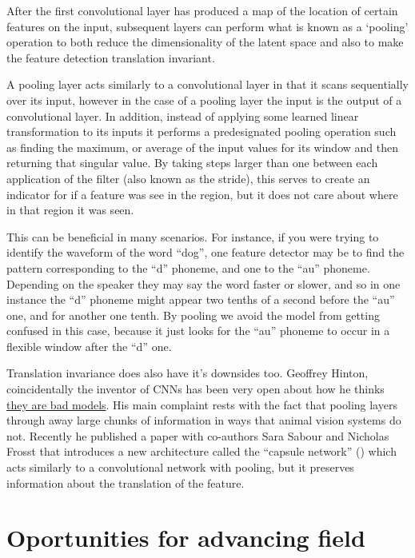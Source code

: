 \documentclass[]{book}
\theoremstyle{definition}
\theoremstyle{definition}
\theoremstyle{definition}
\theoremstyle{remark}
\begin{document}
After the first convolutional layer has produced a map of the location
of certain features on the input, subsequent layers can perform what is
known as a `pooling' operation to both reduce the dimensionality of the
latent space and also to make the feature detection translation
invariant.

A pooling layer acts similarly to a convolutional layer in that it scans
sequentially over its input, however in the case of a pooling layer the
input is the output of a convolutional layer. In addition, instead of
applying some learned linear transformation to its inputs it performs a
predesignated pooling operation such as finding the maximum, or average
of the input values for its window and then returning that singular
value. By taking steps larger than one between each application of the
filter (also known as the stride), this serves to create an indicator
for if a feature was see in the region, but it does not care about where
in that region it was seen.

This can be beneficial in many scenarios. For instance, if you were
trying to identify the waveform of the word ``dog'', one feature
detector may be to find the pattern corresponding to the ``d'' phoneme,
and one to the ``au'' phoneme. Depending on the speaker they may say the
word faster or slower, and so in one instance the ``d'' phoneme might
appear two tenths of a second before the ``au'' one, and for another one
tenth. By pooling we avoid the model from getting confused in this case,
because it just looks for the ``au'' phoneme to occur in a flexible
window after the ``d'' one.

Translation invariance does also have it's downsides too. Geoffrey
Hinton, coincidentally the inventor of CNNs has been very open about how
he thinks
\href{www.youtube.com\%2Fwatch\%3Fv\%3DrTawFwUvnLE\&usg=AOvVaw3CKtrHEhfBZkXdd7xgJ1PM}{they
are bad models}. His main complaint rests with the fact that pooling
layers through away large chunks of information in ways that animal
vision systems do not. Recently he published a paper with co-authors
Sara Sabour and Nicholas Frosst that introduces a new architecture
called the ``capsule network'' (\citet{capsnet}) which acts similarly to
a convolutional network with pooling, but it preserves information about
the translation of the feature.

\chapter{Oportunities for advancing field}\label{future}
\end{document}
